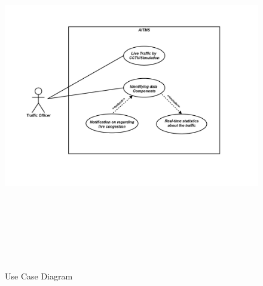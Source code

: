 \documentclass[openany,12pt]{report}
\begin{document}
	\begin{figure}[H]
		\centering
		\includegraphics[height=6in]{./Diagrams/PNG/uml}
		\caption{Use Case Diagram}
	\end{figure}
	

	\newpage
\end{document}
